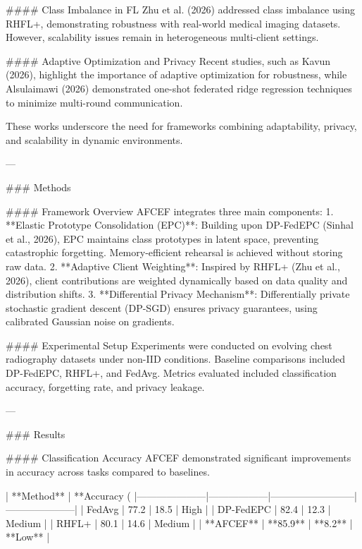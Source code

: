 #### Class Imbalance in FL  
Zhu et al. (2026) addressed class imbalance using RHFL+, demonstrating robustness with real-world medical imaging datasets. However, scalability issues remain in heterogeneous multi-client settings.

#### Adaptive Optimization and Privacy  
Recent studies, such as Kavun (2026), highlight the importance of adaptive optimization for robustness, while Alsulaimawi (2026) demonstrated one-shot federated ridge regression techniques to minimize multi-round communication.

These works underscore the need for frameworks combining adaptability, privacy, and scalability in dynamic environments.

---

### Methods  

#### Framework Overview  
AFCEF integrates three main components:  
1. **Elastic Prototype Consolidation (EPC)**: Building upon DP-FedEPC (Sinhal et al., 2026), EPC maintains class prototypes in latent space, preventing catastrophic forgetting. Memory-efficient rehearsal is achieved without storing raw data.  
2. **Adaptive Client Weighting**: Inspired by RHFL+ (Zhu et al., 2026), client contributions are weighted dynamically based on data quality and distribution shifts.  
3. **Differential Privacy Mechanism**: Differentially private stochastic gradient descent (DP-SGD) ensures privacy guarantees, using calibrated Gaussian noise on gradients.

#### Experimental Setup  
Experiments were conducted on evolving chest radiography datasets under non-IID conditions. Baseline comparisons included DP-FedEPC, RHFL+, and FedAvg. Metrics evaluated included classification accuracy, forgetting rate, and privacy leakage.

---

### Results  

#### Classification Accuracy  
AFCEF demonstrated significant improvements in accuracy across tasks compared to baselines.  

| **Method**         | **Accuracy (%
|---------------------|------------------|--------------------------|---------------------|
| FedAvg              | 77.2            | 18.5                    | High               |
| DP-FedEPC           | 82.4            | 12.3                    | Medium             |
| RHFL+               | 80.1            | 14.6                    | Medium             |
| **AFCEF**           | **85.9**        | **8.2**                 | **Low**            |

